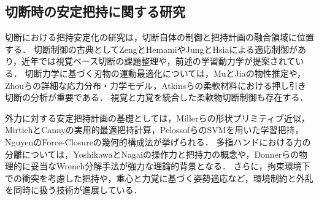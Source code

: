 \subsection{切断時の安定把持に関する研究}
切断における把持安定化の研究は，切断自体の制御と把持計画の融合領域に位置する．
切断制御の古典としてZengとHemami\cite{ZengHemami1997Cutting}やJungとHsia\cite{JungHsia1999Cutting}による適応制御があり，近年では視覚ベース切断の課題整理\cite{Singh2025VisionBasedCuttingSurvey}や，前述の学習動力学\cite{Mitsioni2021FoodCuttingDynamics}が提案されている．
切断力学に基づく刃物の運動最適化については，MuとJia\cite{MuJia2022PropertyKnifeOpt}の物性推定や，Zhouらの詳細な応力分布・力学モデル\cite{Zhou2006PressSliceI, Zhou2006PressSliceII}，Atkinsら\cite{Atkins2004CheddarSalami}の柔軟材料における押し引き切断の分析が重要である．
視覚と力覚を統合した柔軟物切断制御\cite{Long2014ForceVisionCutting}も存在する．

外力に対する安定把持計画の基礎としては，Millerら\cite{Miller2003ShapePrimitives}の形状プリミティブ近似，MirtichとCanny\cite{MirtichCanny1994OptGrasps}の実用的最適把持計算，Pelossofら\cite{Pelossof2004SVMGrasping}のSVMを用いた学習把持，Nguyen\cite{Nguyen1988ForceClosure}のForce-Closureの幾何的構成法が挙げられる．
多指ハンドにおける力の分離については，YoshikawaとNagai\cite{YoshikawaNagai1987Forces}の操作力と把持力の概念や，Donnerら\cite{Donner2018WrenchDecomposition}の物理的に妥当なWrench分解手法が強力な理論的背景となる．
さらに，拘束環境下での衝突を考慮した把持\cite{Lou2021CollisionAwareGrasping}や，重心と力覚に基づく姿勢適応\cite{Kanoulas2018CoMGraspAdapt}など，環境制約と外乱を同時に扱う技術が進展している．

